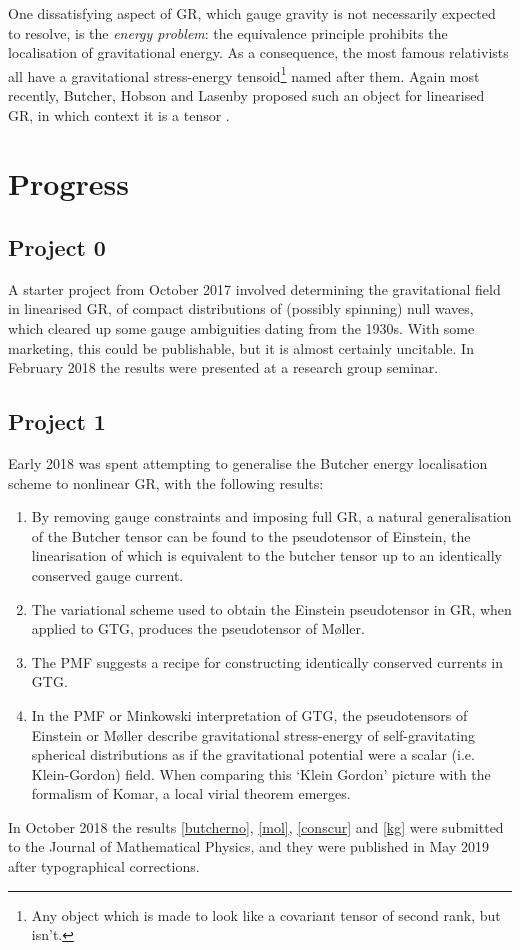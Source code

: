 \documentclass[twoside]{report}
\begin{document}
\begin{multicols}{2}
One dissatisfying aspect of GR, which gauge gravity is not necessarily expected to resolve, is the \textit{energy problem}: the equivalence principle prohibits the localisation of gravitational energy. As a consequence, the most famous relativists all have a gravitational stress-energy tensoid\footnote{Any object which is made to look like a covariant tensor of second rank, but isn't.} named after them. Again most recently, Butcher, Hobson and Lasenby proposed such an object for linearised GR, in which context it is a tensor \cite{2014JPhCS.484a2011B,2012PhRvD..86h4012B,2012PhRvD..86h4013B}. 

\section{Progress}\label{progress}
\subsection{Project 0}\label{zer}
A starter project from October 2017 involved determining the gravitational field in linearised GR, of compact distributions of (possibly spinning) null waves, which cleared up some gauge ambiguities dating from the 1930s. With some marketing, this could be publishable, but it is almost certainly uncitable.
In February 2018 the results were presented \cite{sem} at a research group seminar.
\subsection{Project 1}\label{pr1}
Early 2018 was spent attempting to generalise the Butcher energy localisation scheme \cite{2014JPhCS.484a2011B,2012PhRvD..86h4012B,2012PhRvD..86h4013B} to nonlinear GR, with the following results:
\begin{enumerate}[resume]
  \item\label{butcherno} By removing gauge constraints and imposing full GR, a natural generalisation of the Butcher tensor can be found to the pseudotensor of Einstein, the linearisation of which is equivalent to the butcher tensor up to an identically conserved gauge current.
  \item\label{mol} The variational scheme used to obtain the Einstein pseudotensor in GR, when applied to GTG, produces the pseudotensor of M{\o}ller.
  \item\label{conscur} The PMF suggests a recipe for constructing identically conserved currents in GTG.
  \item\label{kg} In the PMF or Minkowski interpretation of GTG, the pseudotensors of Einstein or M{\o}ller describe gravitational stress-energy of self-gravitating spherical distributions as if the gravitational potential were a scalar (i.e. Klein-Gordon) field. When comparing this `Klein Gordon' picture with the formalism of Komar, a local virial theorem emerges.
\end{enumerate}
In October 2018 the results \ref{butcherno}, \ref{mol}, \ref{conscur} and \ref{kg} were submitted to the Journal of Mathematical Physics, and they were published \cite{2019JMP....60e2504B} in May 2019 after typographical corrections.

\end{multicols}
\end{document}
